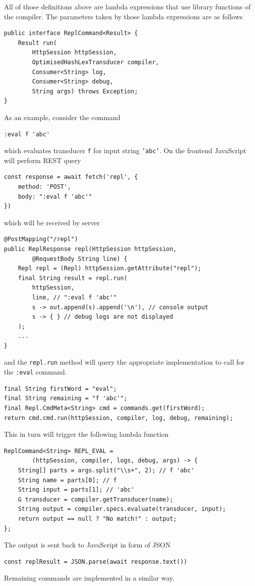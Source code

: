 All of those definitions above are lambda expressions that use library functions
of the compiler. The parameters taken by those lambda expressions are as follows
\begin{lstlisting}
public interface ReplCommand<Result> {
    Result run(
        HttpSession httpSession, 
        OptimisedHashLexTransducer compiler, 
        Consumer<String> log, 
        Consumer<String> debug, 
        String args) throws Exception;
}
\end{lstlisting}
As an example, consider the command 
\begin{lstlisting}
:eval f 'abc'
\end{lstlisting}
which evaluates transducer \texttt{f} for input string \texttt{'abc'}. 
On the frontend JavaScript will perform REST query
\begin{lstlisting}
const response = await fetch('repl', {
	method: 'POST',
	body: ":eval f 'abc'"
})
\end{lstlisting}
which will be received by server
\begin{lstlisting}
@PostMapping("/repl")
public ReplResponse repl(HttpSession httpSession, 
        @RequestBody String line) {
    Repl repl = (Repl) httpSession.getAttribute("repl");
    final String result = repl.run(
        httpSession, 
        line, // ":eval f 'abc'"
        s -> out.append(s).append('\n'), // console output
        s -> { } // debug logs are not displayed
    );
    ...
}
\end{lstlisting}
and the \texttt{repl.run} method will query the appropriate implementation to call for
the \texttt{:eval} command.
\begin{lstlisting}	
final String firstWord = "eval";
final String remaining = "f 'abc'";
final Repl.CmdMeta<String> cmd = commands.get(firstWord);
return cmd.cmd.run(httpSession, compiler, log, debug, remaining);
\end{lstlisting}
This in turn will trigger the following lambda function
\begin{lstlisting}
ReplCommand<String> REPL_EVAL = 
        (httpSession, compiler, logs, debug, args) -> {
    String[] parts = args.split("\\s+", 2); // f 'abc'
    String name = parts[0]; // f
    String input = parts[1]; // 'abc'
    G transducer = compiler.getTransducer(name);
    String output = compiler.specs.evaluate(transducer, input);
    return output == null ? "No match!" : output;
};
\end{lstlisting}
The output is sent back to JavaScript in form of JSON
\begin{lstlisting}
const replResult = JSON.parse(await response.text())
\end{lstlisting}
Remaining commands are implemented in a similar way.

